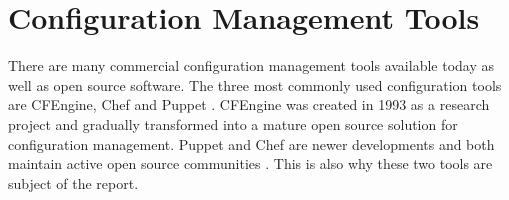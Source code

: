 \section{Configuration Management Tools}



There are many commercial configuration management tools available today as well as open source software. The three most commonly used configuration tools are CFEngine, Chef and Puppet \cite{pandey2012investigating}. CFEngine was created in 1993 as a research project and gradually transformed into a mature open source solution for configuration management\cite{Zamboni:2012:LCA:2341102}. Puppet and Chef are newer developments and both maintain active open source communities \cite{pandey2012investigating}. This is also why these two tools are subject of the report.

